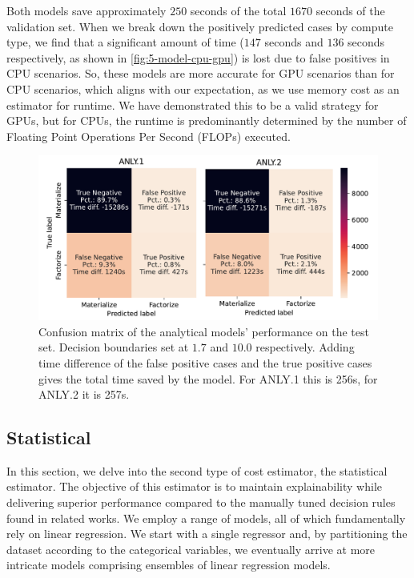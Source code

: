 Both models save approximately $250$ seconds of the total $1670$ seconds of the validation set. When we break down the positively predicted cases by compute type, we find that a significant amount of time ($147$ seconds and $136$ seconds respectively, as shown in \autoref{fig:5-model-cpu-gpu}) is lost due to false positives in CPU scenarios. So, these models are more accurate for GPU scenarios than for CPU scenarios, which aligns with our expectation, as we use memory cost as an estimator for runtime. We have demonstrated this to be a valid strategy for GPUs, but for CPUs, the runtime is predominantly determined by the number of Floating Point Operations Per Second (FLOPs) executed.

\begin{figure}[ht]
    \centering
    \includegraphics[width=0.9\linewidth]{chapters/05_cost_estimation/figures/analytical-models-compare.pdf}
    \caption[Analytical Model Confusion Matrix]{Confusion matrix of the analytical models' performance on the test set. Decision boundaries set at $1.7$ and $10.0$ respectively. Adding time difference of the false positive cases and the true positive cases gives the total time saved by the model. For ANLY.1 this is 256s, for ANLY.2 it is 257s. }
    \label{fig:5-analytical-model-evaluation}
\end{figure}


\subsection{Statistical}
\label{subsec:5-statistical}
In this section, we delve into the second type of cost estimator, the statistical estimator. The objective of this estimator is to maintain explainability while delivering superior performance compared to the manually tuned decision rules found in related works. We employ a range of models, all of which fundamentally rely on linear regression. We start with a single regressor and, by partitioning the dataset according to the categorical variables, we eventually arrive at more intricate models comprising ensembles of linear regression models.

